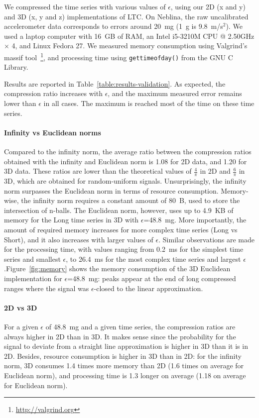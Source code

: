\documentclass[10pt, conference, compsocconf]{IEEEtran}
\begin{document}
We compressed the time series with various values of $\epsilon$, using 
our 2D (x and y) and 3D (x, y and z) implementations of LTC. On 
Neblina, the raw uncalibrated accelerometer data corresponds to errors 
around 20~mg (1~g is 9.8~m/s$^2$). We used a 
laptop computer with 16~GB of RAM, an Intel i5-3210M CPU @ 2.50GHz 
× 4, and Linux Fedora 27. We measured memory consumption using 
Valgrind's massif 
tool~\cite{nethercote2006building}\footnote{\url{http://valgrind.org}}, 
and processing time using \texttt{gettimeofday()} from the GNU C 
Library. 

Results are reported in Table~\ref{table:results-validation}. 
As expected, the compression ratio increases with $\epsilon$, and the 
maximum measured error remains lower than $\epsilon$ in all cases. The 
maximum is reached most of the time on these time series.

\paragraph{Infinity vs Euclidean norms}
Compared to the infinity norm, the average ratio between the compression ratios obtained
with the infinity and Euclidean norm is 1.08 for 2D data, and 1.20
for 3D data. These ratios are lower than the theoretical values of
$\frac{4}{\pi}$ in 2D and $\frac{6}{\pi}$ in 3D, which are obtained for
random-uniform signals. Unsurprisingly, the infinity norm surpasses the
Euclidean norm in terms of resource consumption. Memory-wise, the
infinity norm requires a constant amount of 80~B, used to store the
intersection of n-balls. The Euclidean norm, however, uses up to 4.9~KB of memory
for the Long time series in 3D with $\epsilon$=48.8~mg. More importantly,
the amount of required memory increases for more complex time series
(Long vs Short), and it also increases with larger
values of $\epsilon$. Similar observations are made for the processing
time, with values ranging from 0.2~ms for the simplest time series and
smallest $\epsilon$, to 26.4~ms for the most complex time series and
largest $\epsilon$.Figure~\ref{fig:memory} shows the memory consumption 
of the 3D Euclidean implementation for $\epsilon$=48.8~mg: peaks appear
at the end of long compressed ranges where the signal was $\epsilon$-closed
to the linear approximation.

\paragraph{2D vs 3D}
For a given $\epsilon$ of 48.8~mg and a given time series, the compression 
ratios are always higher in 2D than in 3D. It makes sense since the
probability for the signal to deviate from a straight line
approximation is higher in 3D than it is in 2D. Besides, resource
consumption is higher in 3D than in 2D: for the infinity norm, 3D
consumes 1.4 times more memory than 2D (1.6 times on average for
Euclidean norm), and processing time is 1.3 longer on average (1.18 on
average for Euclidean norm).
\end{document}
